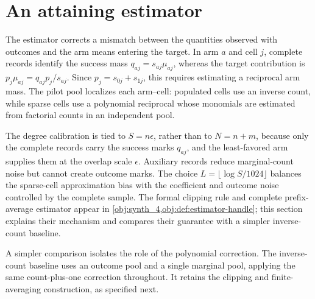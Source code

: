 \section{An attaining estimator}\label{sec:attaining-estimator}

The estimator corrects a mismatch between the quantities observed with outcomes and the arm means entering the target. In arm \(a\) and cell \(j\), complete records identify the success mass \(q_{aj}=s_{aj}\mu_{aj}\), whereas the target contribution is \(p_j\mu_{aj}=q_{aj}p_j/s_{aj}\). Since \(p_j=s_{0j}+s_{1j}\), this requires estimating a reciprocal arm mass. The pilot pool localizes each arm--cell: populated cells use an inverse count, while sparse cells use a polynomial reciprocal whose monomials are estimated from factorial counts in an independent pool.

The degree calibration is tied to \(S=n\epsilon\), rather than to \(N=n+m\), because only the complete records carry the success marks \(q_{aj}\), and the least-favored arm supplies them at the overlap scale \(\epsilon\). Auxiliary records reduce marginal-count noise but cannot create outcome marks. The choice \(L=\lfloor\log S/1024\rfloor\) balances the sparse-cell approximation bias with the coefficient and outcome noise controlled by the complete sample. The formal clipping rule and complete prefix-average estimator appear in \cref{obj:synth_4,obj:def:estimator-handle}; this section explains their mechanism and compares their guarantee with a simpler inverse-count baseline.





A simpler comparison isolates the role of the polynomial correction. The inverse-count baseline  uses an outcome pool and a single marginal pool, applying the same count-plus-one correction throughout. It retains the clipping and finite-averaging construction, as specified next.





